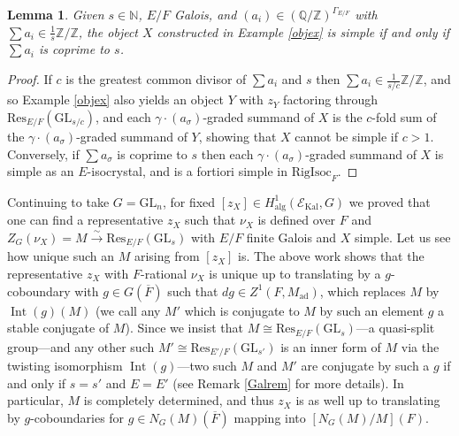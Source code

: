 \documentclass[11pt]{amsart}
\newtheorem{lem}[thm]{Lemma}
\theoremstyle{definition}
\newcommand{\mc}{\mathcal}
\newcommand{\Z}{\mathbb{Z}}
\newcommand{\Q}{\mathbb{Q}}
\newcommand{\ov}{\overline}
\newcommand{\N}{\mathbb{N}}
\newcommand{\Res}{\mathrm{Res}}
\newcommand{\RigIsoc}{\mathrm{RigIsoc}}
\newcommand{\GL}{\mathrm{GL}}
\DeclareMathOperator{\Kal}{Kal}
\DeclareMathOperator{\Int}{Int}
\DeclareMathOperator{\ad}{ad}
\begin{document}
\begin{lem}
    Given $s \in \N$, $E/F$ Galois, and $(a_{i}) \in (\Q/\Z)^{\Gamma_{E/F}}$ with $\sum a_{i} \in \frac{1}{s}\Z/\Z$, the object $X$ constructed in Example \ref{objex} is simple if and only if $\sum a_{i}$ is coprime to $s$.
\end{lem}

\begin{proof}
    If $c$ is the greatest common divisor of $\sum a_{i}$ and $s$ then $\sum a_{i} \in \frac{1}{s/c}\Z/\Z$, and so Example \ref{objex} also yields an object $Y$ with $z_{Y}$ factoring through $\Res_{E/F}(\GL_{s/c})$, and each $\gamma \cdot (a_{\sigma})$-graded summand of $X$ is the $c$-fold sum of the $\gamma \cdot (a_{\sigma})$-graded summand of $Y$, showing that $X$ cannot be simple if $c>1$. Conversely, if $\sum a_{\sigma}$ is coprime to $s$ then each $\gamma \cdot (a_{\sigma})$-graded summand of $X$ is simple as an $E$-isocrystal, and is a fortiori simple in $\RigIsoc_{F}$.
\end{proof}

    Continuing to take $G = \GL_{n}$, for fixed $[z_{X}] \in H^{1}_{\text{alg}}(\mc{E}_{\Kal}, G)$ we proved that one can find a representative $z_{X}$ such that $\nu_{X}$ is defined over $F$ and $Z_{G}(\nu_{X}) = M \xrightarrow{\sim} \Res_{E/F}(\GL_{s})$ with $E/F$ finite Galois and $X$ simple. Let us see how unique such an $M$ arising from $[z_{X}]$ is. The above work shows that the representative $z_{X}$ with $F$-rational $\nu_{X}$  is unique up to translating by a $g$-coboundary with $g \in G(\ov{F})$ such that $dg \in Z^{1}(F, M_{\ad})$, which replaces $M$ by $\Int(g)(M)$ (we call any $M'$ which is conjugate to $M$ by such an element $g$ a stable conjugate of $M$). Since we insist that $M \cong \Res_{E/F}(\GL_{s})$---a quasi-split group---and any other such $M' \cong \Res_{E'/F}(\GL_{s'})$ is an inner form of $M$ via the twisting isomorphism $\Int(g)$---two such $M$ and $M'$ are conjugate by such a $g$ if and only if $s = s'$ and $E = E'$ (see Remark \ref{Galrem} for more details). In particular, $M$ is completely determined, and thus $z_{X}$ is as well up to translating by $g$-coboundaries for $g \in N_{G}(M)(\ov{F})$ mapping into $[N_{G}(M)/M](F)$. 
\end{document}
